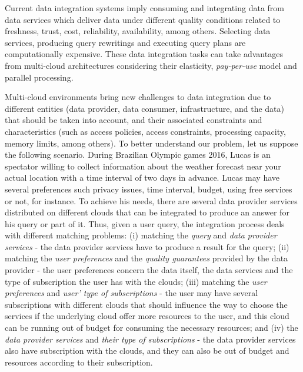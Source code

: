 Current data integration systems imply consuming and integrating data from data services which deliver data under different quality conditions related to freshness, trust, cost, reliability, availability, among others. Selecting data services, producing query rewritings and executing query plans are computationally expensive. These data integration tasks can take advantages from multi-cloud architectures considering their elasticity, \textit{pay-per-use} model and parallel processing.

Multi-cloud environments bring new challenges to data integration due to different entities (data provider, data consumer, infrastructure, and the data) that should be taken into account, and their associated constraints and characteristics (such as access policies, access constraints, processing capacity, memory limits, among others). 
%
To better understand our problem, let us suppose the following scenario. 
During Brazilian Olympic games 2016, Lucas is an spectator willing to collect information about the weather forecast near your actual location with a time interval of two days in advance. 
%
Lucas may have several preferences such privacy issues, time interval, budget, using free services or not, for instance. 
%
To achieve his needs, there are several data provider services distributed on different clouds that can be integrated to produce an answer for his query or part of it. 
%
Thus, given a user query, the integration process deals with different matching problems: 
(i) matching the \textit{query} and \textit{data provider services} - the data provider services have to produce a result for the query; 
(ii) matching the \textit{user preferences} and the \textit{quality guarantees} provided by the data provider - the user preferences concern the data itself, the data services and the type of subscription the user has with the clouds; 
(iii) matching the \textit{user preferences} and \textit{user' type of subscriptions} - the user may have several subscriptions with different clouds that should influence the way to choose the services if the underlying cloud offer more resources to the user, and this cloud can be running out of budget for consuming the necessary resources; and 
(iv) the \textit{data provider services} and \textit{their type of subscriptions} - the data provider services also have  subscription with the clouds, and they can also be out of budget and resources according to their subscription.

